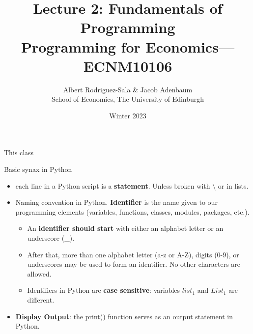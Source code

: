 \documentclass[10pt,aspectratio=169,xcolor=x11names,compress,dvipsnames]{beamer}
\title[]{Lecture 2: Fundamentals of Programming \\ Programming for Economics---ECNM10106}
\author{Albert Rodriguez-Sala \& Jacob  Adenbaum \\
School of Economics, The University of Edinburgh }
\date{Winter 2023}
\begin{document}

    \maketitle


\begin{frame}{This class}
 \tableofcontents 
\end{frame}  


\begin{frame}{Basic synax in Python}

\begin{itemize}
    \item each line in a Python script is a\textbf{ statement}. Unless broken with $\setminus$ or in lists.
    \item Naming convention in Python. \textbf{Identifier} is the name given to our programming elements (variables, functions, classes, modules, packages, etc.). 
    \begin{itemize}
        \item An \textbf{identifier should start} with either an alphabet letter or an underscore (\_). 
        \item After that, more than one alphabet letter (a-z or A-Z), digits (0-9), or underscores may be used to form an identifier. No other characters are allowed.
        \item Identifiers in Python are \textbf{case sensitive}: variables $list_1$ and $List_1$ are different.
        
        
    \end{itemize}
    \item \textbf{Display Output}: the print() function serves as an output statement in Python.
\end{itemize}




    
\end{frame}
\end{document}

